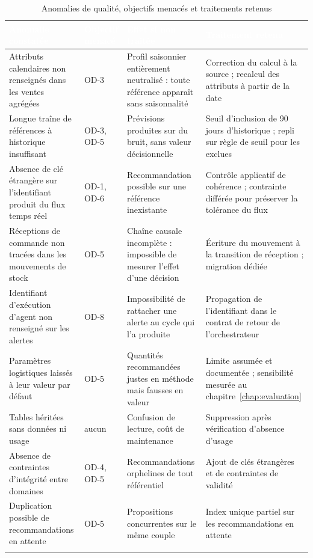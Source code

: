\begingroup
\setlength{\tabcolsep}{3pt}
\renewcommand{\arraystretch}{1.15}
\small

\begin{longtable}{|P{3.9cm}|P{1.9cm}|P{4.1cm}|P{4.1cm}|}
\hline
{}
\textcolor{white}{\textbf{Anomalie constatée}} &
\textcolor{white}{\textbf{Objectif menacé}} &
\textcolor{white}{\textbf{Effet si non traitée}} &
\textcolor{white}{\textbf{Traitement retenu}} \\
\hline
\endhead
\hline
\endfoot
\hline
\endlastfoot
Attributs calendaires non renseignés dans les ventes agrégées & OD-3 & Profil saisonnier entièrement neutralisé : toute référence apparaît sans saisonnalité & Correction du calcul à la source ; recalcul des attributs à partir de la date \\
\hline
Longue traîne de références à historique insuffisant & OD-3, OD-5 & Prévisions produites sur du bruit, sans valeur décisionnelle & Seuil d'inclusion de 90 jours d'historique ; repli sur règle de seuil pour les exclues \\
\hline
Absence de clé étrangère sur l'identifiant produit du flux temps réel & OD-1, OD-6 & Recommandation possible sur une référence inexistante & Contrôle applicatif de cohérence ; contrainte différée pour préserver la tolérance du flux \\
\hline
Réceptions de commande non tracées dans les mouvements de stock & OD-5 & Chaîne causale incomplète : impossible de mesurer l'effet d'une décision & Écriture du mouvement à la transition de réception ; migration dédiée \\
\hline
Identifiant d'exécution d'agent non renseigné sur les alertes & OD-8 & Impossibilité de rattacher une alerte au cycle qui l'a produite & Propagation de l'identifiant dans le contrat de retour de l'orchestrateur \\
\hline
Paramètres logistiques laissés à leur valeur par défaut & OD-5 & Quantités recommandées justes en méthode mais fausses en valeur & Limite assumée et documentée ; sensibilité mesurée au chapitre~\ref{chap:evaluation} \\
\hline
Tables héritées sans données ni usage & aucun & Confusion de lecture, coût de maintenance & Suppression après vérification d'absence d'usage \\
\hline
Absence de contraintes d'intégrité entre domaines & OD-4, OD-5 & Recommandations orphelines de tout référentiel & Ajout de clés étrangères et de contraintes de validité \\
\hline
Duplication possible de recommandations en attente & OD-5 & Propositions concurrentes sur le même couple & Index unique partiel sur les recommandations en attente \\
\hline
\caption{Anomalies de qualité, objectifs menacés et traitements retenus}
\label{tab:qualite-chap3}
\end{longtable}
\endgroup

